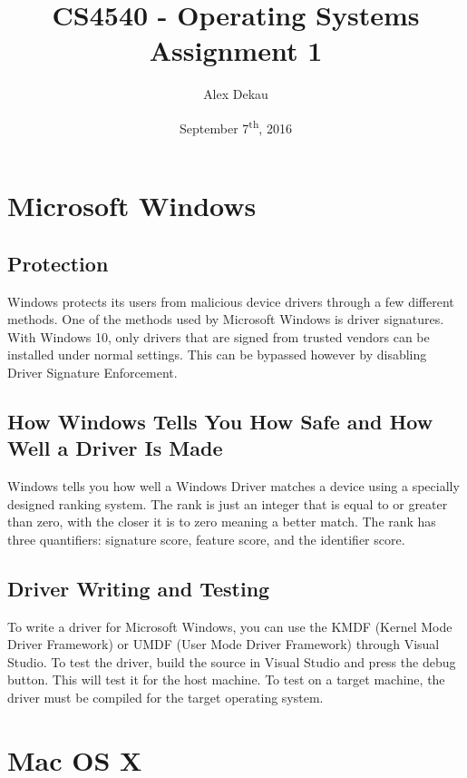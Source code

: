 \documentclass[11pt]{article}
\begin{document}
\title{CS4540 - Operating Systems\\Assignment 1}
\author{Alex Dekau}
\date{September 7\textsuperscript{th}, 2016}
\maketitle


\section{Microsoft Windows}
\subsection{Protection}
Windows protects its users from malicious device drivers through a few different methods. One of the methods used by Microsoft Windows is driver signatures\cite{ws2003}.
With Windows 10, only drivers that are signed from trusted vendors can be installed under normal settings. This can be bypassed however by disabling Driver Signature Enforcement\cite{wenforcement}.


\subsection{How Windows Tells You How Safe and How Well a Driver Is Made}
Windows tells you how well a Windows Driver matches a device using a specially designed ranking system. The rank is just an integer that is equal to or greater than zero, with the closer it is to zero meaning a better match\cite{wrank}.
The rank has three quantifiers: signature score, feature score, and the identifier score\cite{wrank}.

\subsection{Driver Writing and Testing}
To write a driver for Microsoft Windows, you can use the KMDF (Kernel Mode Driver Framework) or UMDF (User Mode Driver Framework)\cite{wwritedriver} through Visual Studio. To test the driver, build the source in Visual Studio and press the debug button. This will test it for the host machine. To test on a target machine, the driver must be compiled for the target operating system\cite{wwritedriver}.


\section{Mac OS X}
\end{document}
